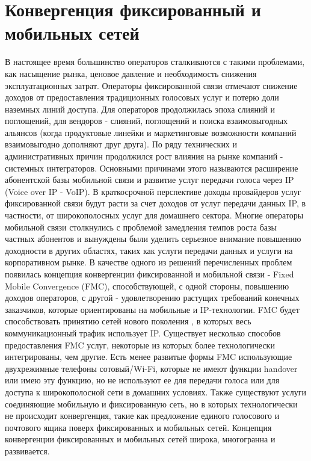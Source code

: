\section{Конвергенция фиксированный и мобильных сетей} \label{sect1_1}
В настоящее время большинство операторов сталкиваются с такими проблемами, как насыщение рынка, ценовое давление и необходимость снижения эксплуатационных затрат. Операторы фиксированной связи отмечают снижение доходов от предоставления традиционных голосовых услуг и потерю доли наземных линий доступа. Для операторов продолжилась эпоха слияний и поглощений, для вендоров - слияний, поглощений и поиска взаимовыгодных альянсов (когда продуктовые линейки и маркетинговые возможности компаний взаимовыгодно дополняют друг друга). По ряду технических и административных причин продолжился рост влияния на рынке компаний - системных интеграторов. Основными причинами этого называются расширение абонентской базы мобильной связи и развитие услуг передачи голоса через IP (Voice over IP - VoIP). В краткосрочной перспективе доходы провайдеров услуг фиксированной связи будут расти за счет доходов от услуг передачи данных IP, в частности, от широкополосных услуг для домашнего сектора.  Многие операторы мобильной связи столкнулись с проблемой замедления темпов роста базы частных абонентов и вынуждены были уделить серьезное внимание повышению доходности в других областях, таких как услуги передачи данных и услуги на корпоративном рынке. В качестве одного из решений перечисленных проблем появилась концепция конвергенции фиксированной и мобильной связи - Fixed Mobile Convergence (FMC), способствующей, с одной стороны, повышению доходов операторов, с другой - удовлетворению растущих требований конечных заказчиков, которые ориентированы на мобильные и IP-технологии. FMC будет способствовать принятию сетей нового поколения \cite{FMC}, в которых весь коммуникационный трафик использует IP.
Существует несколько способов предоставления FMC услуг, некоторые из которых более технологически интегрированы, чем другие. Есть менее развитые формы FMC использующие двухрежимные телефоны сотовый/Wi-Fi, которые не имеют функции handover или имею эту функцию, но не используют ее для передачи голоса или для доступа к широкополосной сети в домашних условиях. Также существуют услуги соединяющие мобильную и фиксированную сеть, но в которых технологически не происходит конвергенция, такие как предложение единого голосового и почтового ящика поверх фиксированных и мобильных сетей.
Концепция конвергенции фиксированных и мобильных сетей широка, многогранна и развивается. 


